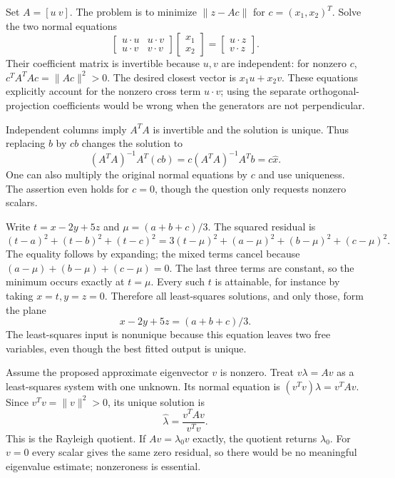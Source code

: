 Set $A=[u\ v]$. The problem is to minimize $\|z-Ac\|$ for
$c=(x_1,x_2)^T$. Solve the two normal equations
\[
 \begin{bmatrix}u\cdot u&u\cdot v\\u\cdot v&v\cdot v\end{bmatrix}
 \begin{bmatrix}x_1\\x_2\end{bmatrix}
 =\begin{bmatrix}u\cdot z\\v\cdot z\end{bmatrix}.
\]
Their coefficient matrix is invertible because $u,v$ are independent:
for nonzero $c$, $c^TA^TAc=\|Ac\|^2>0$.
The desired closest vector is $x_1u+x_2v$.
These equations explicitly account for the nonzero cross term $u\cdot v$;
using the separate orthogonal-projection coefficients would be wrong when
the generators are not perpendicular.

Independent columns imply $A^TA$ is invertible and the solution is unique.
Thus replacing $b$ by $cb$ changes the solution to
\[
 (A^TA)^{-1}A^T(cb)=c(A^TA)^{-1}A^Tb=c\widehat x.
\]
One can also multiply the original normal equations by $c$ and use
uniqueness. The assertion even holds for $c=0$, though the question only
requests nonzero scalars.

Write $t=x-2y+5z$ and $\mu=(a+b+c)/3$.
The squared residual is
\[
 (t-a)^2+(t-b)^2+(t-c)^2
 =3(t-\mu)^2+(a-\mu)^2+(b-\mu)^2+(c-\mu)^2.
\]
The equality follows by expanding; the mixed terms cancel because
$(a-\mu)+(b-\mu)+(c-\mu)=0$.
The last three terms are constant, so the minimum occurs exactly at
$t=\mu$. Every such $t$ is attainable, for instance by taking $x=t,y=z=0$.
Therefore all least-squares solutions, and only those, form the plane
\[
 \boxed{x-2y+5z=(a+b+c)/3}.
\]
The least-squares input is nonunique because this equation leaves two free
variables, even though the best fitted output is unique.

Assume the proposed approximate eigenvector $v$ is nonzero.
Treat $v\lambda=Av$ as a least-squares system with one unknown.
Its normal equation is
$(v^Tv)\lambda=v^TAv$.
Since $v^Tv=\|v\|^2>0$, its unique solution is
\[
 \boxed{\widehat\lambda=\frac{v^TAv}{v^Tv}}.
\]
This is the Rayleigh quotient. If $Av=\lambda_0v$ exactly, the quotient
returns $\lambda_0$. For $v=0$ every scalar gives the same zero residual,
so there would be no meaningful eigenvalue estimate; nonzeroness is essential.

